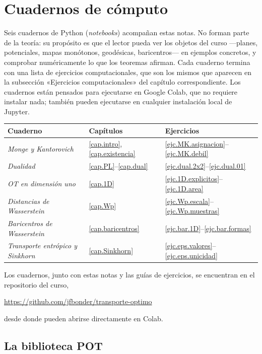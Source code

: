 \documentclass[12pt, a4paper]{amsbook}
\theoremstyle{remark}
\theoremstyle{definition}
\numberwithin{section}{chapter}
\numberwithin{subsection}{section}
\numberwithin{equation}{section}
\numberwithin{figure}{chapter}
\begin{document}
\chapter{Cuadernos de cómputo}\label{ap.cuadernos}

Seis cuadernos de Python (\emph{notebooks}) acompañan estas notas. No forman
parte de la teoría: su propósito es que el lector pueda ver los objetos del
curso ---planes, potenciales, mapas monótonos, geodésicas, baricentros--- en
ejemplos concretos, y comprobar numéricamente lo que los teoremas afirman.
Cada cuaderno termina con una lista de ejercicios computacionales, que son
los mismos que aparecen en la subsección «Ejercicios computacionales» del
capítulo correspondiente. Los cuadernos están pensados para ejecutarse en
Google Colab, que no requiere instalar nada; también pueden ejecutarse en
cualquier instalación local de Jupyter.

\begin{center}
\begin{tabular}{lll}
\hline
Cuaderno & Capítulos & Ejercicios \\
\hline
\emph{Monge y Kantorovich} & \ref{cap.intro}, \ref{cap.existencia} & \ref{ejc.MK.asignacion}--\ref{ejc.MK.debil} \\
\emph{Dualidad} & \ref{cap.PL}--\ref{cap.dual} & \ref{ejc.dual.2x2}--\ref{ejc.dual.01} \\
\emph{OT en dimensión uno} & \ref{cap.1D} & \ref{ejc.1D.explicitos}--\ref{ejc.1D.area} \\
\emph{Distancias de Wasserstein} & \ref{cap.Wp} & \ref{ejc.Wp.escala}--\ref{ejc.Wp.muestras} \\
\emph{Baricentros de Wasserstein} & \ref{cap.baricentros} & \ref{ejc.bar.1D}--\ref{ejc.bar.formas} \\
\emph{Transporte entrópico y Sinkhorn} & \ref{cap.Sinkhorn} & \ref{ejc.eps.valores}--\ref{ejc.eps.unicidad} \\
\hline
\end{tabular}
\end{center}

Los cuadernos, junto con estas notas y las guías de ejercicios, se encuentran
en el repositorio del curso,
\begin{center}
\url{https://github.com/jfbonder/transporte-optimo}
\end{center}
desde donde pueden abrirse directamente en Colab.

\section*{La biblioteca POT}
\end{document}
